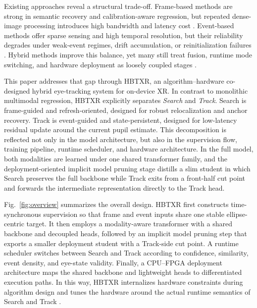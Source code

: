 \documentclass[journal]{IEEEtran}
\begin{document}
Existing approaches reveal a structural trade-off. Frame-based methods are strong in semantic recovery and calibration-aware regression, but repeated dense-image processing introduces high bandwidth and latency cost \cite{ref3}. Event-based methods offer sparse sensing and high temporal resolution, but their reliability degrades under weak-event regimes, drift accumulation, or reinitialization failures \cite{ref4,ref5,ref6}. Hybrid methods improve this balance, yet many still treat fusion, runtime mode switching, and hardware deployment as loosely coupled stages \cite{ref7}.

This paper addresses that gap through HBTXR, an algorithm--hardware co-designed hybrid eye-tracking system for on-device XR. In contrast to monolithic multimodal regression, HBTXR explicitly separates \emph{Search} and \emph{Track}. Search is frame-guided and refresh-oriented, designed for robust relocalization and anchor recovery. Track is event-guided and state-persistent, designed for low-latency residual update around the current pupil estimate. This decomposition is reflected not only in the model architecture, but also in the supervision flow, training pipeline, runtime scheduler, and hardware architecture. In the full model, both modalities are learned under one shared transformer family, and the deployment-oriented implicit model pruning stage distills a slim student in which Search preserves the full backbone while Track exits from a front-half cut point and forwards the intermediate representation directly to the Track head.

Fig.~\ref{fig:overview} summarizes the overall design. HBTXR first constructs time-synchronous supervision so that frame and event inputs share one stable ellipse-centric target. It then employs a modality-aware transformer with a shared backbone and decoupled heads, followed by an implicit model pruning step that exports a smaller deployment student with a Track-side cut point. A runtime scheduler switches between Search and Track according to confidence, similarity, event density, and eye-state validity. Finally, a CPU--FPGA deployment architecture maps the shared backbone and lightweight heads to differentiated execution paths. In this way, HBTXR internalizes hardware constraints during algorithm design and tunes the hardware around the actual runtime semantics of Search and Track \cite{ref12}.
\end{document}
